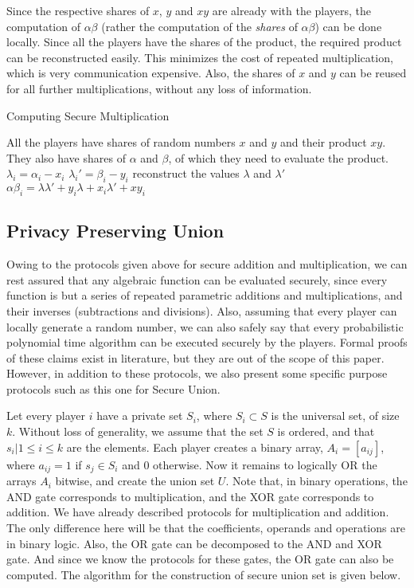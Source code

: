 Since the respective shares of $x$, $y$ and $xy$ are already 
with the players, the computation of $\alpha\beta$
(rather the computation of the \emph{shares} of $\alpha\beta$) can 
be done locally. Since all the players have the shares of
the product, the required product can be reconstructed easily. 
This minimizes the cost of repeated multiplication,
which is very communication expensive. Also, the shares of $x$ 
and $y$ can be reused for all further multiplications,
without any loss of information.

\begin{algorithm}
\caption{Computing Secure Multiplication}
\label{algmult}
\begin{algorithmic}
\REQUIRE All the players have shares of random numbers $x$ and $y$ and their product $xy$.
They also have shares of $\alpha$ and $\beta$, of which they need to evaluate the product.
\STATE {}
	\STATE  $\lambda_{i} = \alpha_{i} - x_{i}$
	\STATE $\lambda_{i}' = \beta_{i} - y_{i}$
	\STATE reconstruct the values $\lambda$ and $\lambda'$
	\STATE $\alpha\beta_{i} = \lambda\lambda' + y_{i}\lambda + x_{i}\lambda' + xy_{i}$
\ENDFOR
\end{algorithmic}
\end{algorithm}

\subsection{Privacy Preserving Union}
\label{sec:union-prim}

Owing to the protocols given above for secure addition and multiplication, we can rest assured that 
any algebraic function can be evaluated securely, since every function is but a series of repeated parametric
additions and multiplications, and their inverses (subtractions and divisions). Also, assuming that every player
can locally generate a random number, we can also safely say that every probabilistic polynomial time algorithm
can be executed securely by the players. Formal proofs of these claims exist in literature, but they are out of 
the scope of this paper. However, in addition to these protocols, we also present some specific purpose protocols
such as this one for Secure Union.

Let every player $i$ have a private set $S_{i}$, where $S_{i} \subset {S}$ is the universal set, of size $k$.
Without loss of generality, we assume that the set ${S}$ is ordered, and that ${s_{i}| 1 \leq i \leq k}$ are 
the elements. Each player creates a binary array, $A_{i} = [a_{ij}]$, where $a_{ij} = 1$ if $s_{j} \in S_{i}$ and $0$ otherwise.
Now it remains to logically OR the arrays $A_{i}$ bitwise, and create the union set $U$. Note that, in binary operations, 
the AND gate corresponds to multiplication, and the XOR gate corresponds to addition. We have already described protocols
for multiplication and addition. The only difference here will be that the coefficients, operands and operations are in 
binary logic. Also, the OR gate can be decomposed to the AND and XOR gate. And since we know the protocols for these
gates, the OR gate can also be computed. The algorithm for the construction of secure union set is given below.

